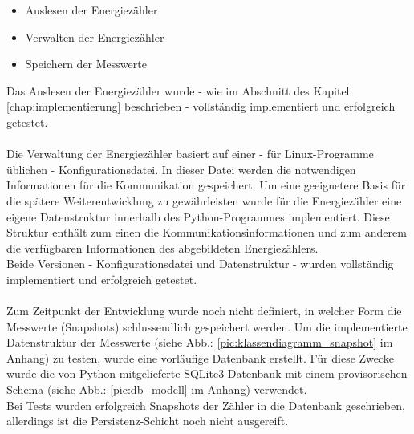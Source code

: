 \documentclass[Bachelorarbeit.tex]{subfiles}
\begin{document}
\begin{itemize}
\item Auslesen der Energiezähler
\item Verwalten der Energiezähler 
\item Speichern der Messwerte
\end{itemize}
Das Auslesen der Energiezähler wurde - wie im Abschnitt  des Kapitel \ref{chap:implementierung} beschrieben - vollständig implementiert und erfolgreich getestet.\\
\\
Die Verwaltung der Energiezähler basiert auf einer - für Linux-Programme üblichen - Konfigurationsdatei. In dieser Datei werden die notwendigen Informationen für die Kommunikation gespeichert. 
Um eine geeignetere Basis für die spätere Weiterentwicklung zu gewährleisten wurde für die Energiezähler eine eigene Datenstruktur innerhalb des Python-Programmes implementiert. 
Diese Struktur enthält zum einen die Kommunikationsinformationen und zum anderem die verfügbaren Informationen des abgebildeten Energiezählers. \\
Beide Versionen - Konfigurationsdatei und Datenstruktur - wurden vollständig implementiert und erfolgreich getestet.\\ 
\\
Zum Zeitpunkt der Entwicklung wurde noch nicht definiert, in welcher Form die Messwerte (Snapshots) schlussendlich gespeichert werden. 
Um die implementierte Datenstruktur der Messwerte (siehe Abb.: \ref{pic:klassendiagramm_snapshot} im Anhang) zu testen, wurde eine vorläufige Datenbank erstellt. 
Für diese Zwecke wurde die von Python mitgelieferte SQLite3 Datenbank mit einem provisorischen Schema (siehe Abb.: \ref{pic:db_modell} im Anhang) verwendet. \\
Bei Tests wurden erfolgreich Snapshots der Zähler in die Datenbank geschrieben, allerdings ist die Persistenz-Schicht noch nicht ausgereift.  
 
\end{document}
